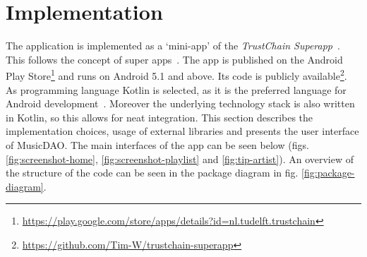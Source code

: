 \chapter{Implementation}
The application is implemented as a `mini-app' of the \textit{TrustChain Superapp}~\citep{mattskala2020}. This follows the concept of super apps~\citep{kpmg2019superapps}. The app is published on the Android Play Store\footnote{\url{https://play.google.com/store/apps/details?id=nl.tudelft.trustchain}} and runs on Android 5.1 and above. Its code is publicly available\footnote{\url{https://github.com/Tim-W/trustchain-superapp}}. As programming language Kotlin is selected, as it is the preferred language for Android development~\citep{googleio2019}. Moreover the underlying technology stack is also written in Kotlin, so this allows for neat integration. This section describes the implementation choices, usage of external libraries and presents the user interface of MusicDAO. The main interfaces of the app can be seen below (figs. \ref{fig:screenshot-home}, \ref{fig:screenshot-playlist} and \ref{fig:tip-artist}). An overview of the structure of the code can be seen in the package diagram in fig. \ref{fig:package-diagram}.
